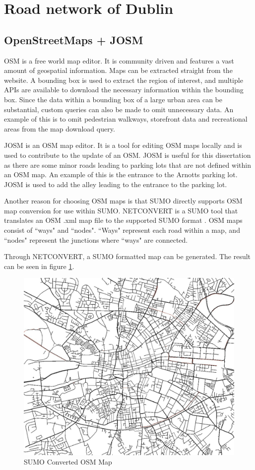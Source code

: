 \section{Road network of Dublin}

\subsection{OpenStreetMaps + JOSM}\label{ssec:netconvert}
\ac{OSM} is a free world map editor. It is community driven and features a vast amount of geospatial information. Maps can be extracted straight from the website. A bounding box is used to extract the region of interest, and multiple APIs are available to download the necessary information within the bounding box. Since the data within a bounding box of a large urban area can be substantial, custom queries can also be made to omit unnecessary data. An example of this is to omit pedestrian walkways, storefront data and recreational areas from the map download query. 

\ac{JOSM} is an \ac{OSM} map editor\citep{2017JOSM}. It is a tool for editing \ac{OSM} maps locally and is used to contribute to the update of an \ac{OSM}. \ac{JOSM} is useful for this dissertation as there are some minor roads leading to parking lots that are not defined within an \ac{OSM} map. An example of this is the entrance to the Arnotts parking lot. \ac{JOSM} is used to add the alley leading to the entrance to the parking lot.

Another reason for choosing \ac{OSM} maps is that \ac{SUMO} directly supports \ac{OSM} map conversion for use within SUMO. NETCONVERT is a SUMO tool that translates an \ac{OSM} .xml map file to the supported \ac{SUMO} format \citep{SUMO2008NETCONVERT}. \ac{OSM} maps consist of ``ways" and ``nodes". ``Ways" represent each road within a map, and ``nodes" represent the junctions where ``ways" are connected.

Through NETCONVERT, a \ac{SUMO} formatted map can be generated. The result can be seen in figure \ref{fig:SUMODUBLIN}.

\begin{figure}[h]
    \centering
    \includegraphics[width=\textwidth]{./Images/SUMODUBLIN.jpg}
    \caption{\ac{SUMO} Converted \ac{OSM} Map}
    \label{fig:SUMODUBLIN}
\end{figure}